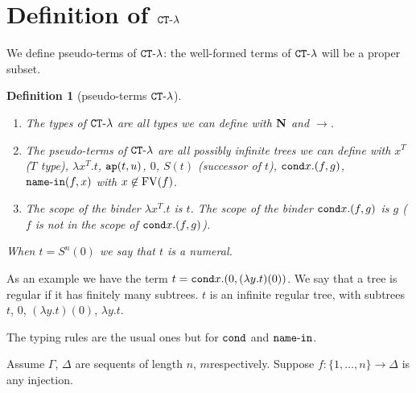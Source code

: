 \documentclass{article}
\newtheorem{definition}[theorem]{Definition}
\begin{document}
\sloppy 
{}










\section{Definition of ${ {\tt CT} \mbox{-} \lambda}$}

We define pseudo-terms of ${ {\tt CT} \mbox{-} \lambda}$: the well-formed terms of ${ {\tt CT} \mbox{-} \lambda}$ will be a proper
subset.

\begin{definition}[pseudo-terms ${ {\tt CT} \mbox{-} \lambda}$]
\mbox{}
\begin{enumerate}

\item
The types of ${ {\tt CT} \mbox{-} \lambda}$ are all types we can define with ${\bf N}$ and $\rightarrow$.

\item
The pseudo-terms of ${ {\tt CT} \mbox{-} \lambda}$ 
are all possibly infinite trees we can define with $x^T$ ($T$ type), $\lambda x^T.t$, 
${\tt ap}(t,u)$, $0$, $S(t)$ (successor of $t$), ${\tt cond} x.(f,g)$, ${\tt name\mbox{-}in}(f,x)$ with $x \not \in {{\rm FV}}(f)$.

\item
The scope of the binder $\lambda x^T.t$ is $t$.
The scope of the binder ${\tt cond} x.(f,g)$ is $g$ ($f$ is \emph{not} in the scope of ${\tt cond} x.(f,g)$).

\end{enumerate}
When $t = S^n(0)$ we say that $t$ is a numeral.
\end{definition}

As an example we have the term $t = {\tt cond} x. (0,(\lambda y.t)(0))$. We say that a tree is regular if
it has finitely many subtrees. $t$ is an infinite regular tree,
with subtrees $t$, $0$, $(\lambda y.t)(0)$, $\lambda y.t$.

The typing rules are the usual ones but for ${\tt cond}$ and ${\tt name\mbox{-}in}$. 

Assume $\Gamma$, $\Delta$ are sequents of length $n$, $m$respectively. Suppose
$f:\{1, \ldots, n\} \rightarrow \Delta$ is any injection.
\end{document}
